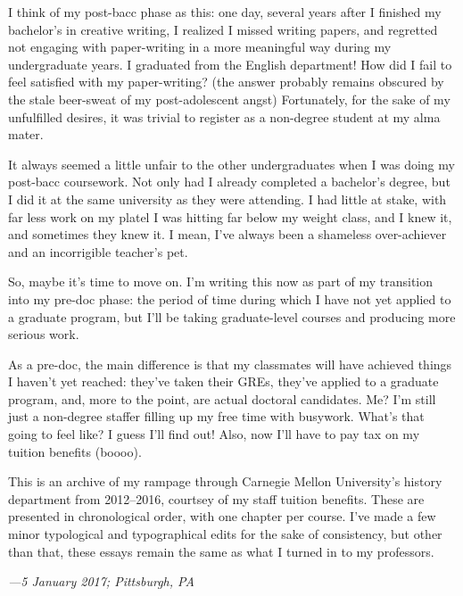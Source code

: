 I think of my post-bacc phase as this: one day, several years after I finished
my bachelor's in creative writing, I realized I missed writing papers, and
regretted not engaging with paper-writing in a more meaningful way during my
undergraduate years. I graduated from the English department! How did I fail to
feel satisfied with my paper-writing? (the answer probably remains obscured by
the stale beer-sweat of my post-adolescent angst) Fortunately, for the sake of
my unfulfilled desires, it was trivial to register as a non-degree student at my
alma mater.

It always seemed a little unfair to the other undergraduates when I was doing my
post-bacc coursework. Not only had I already completed a bachelor's degree, but
I did it at the same university as they were attending. I had little at stake,
with far less work on my platel I was hitting far below my weight class, and I
knew it, and sometimes they knew it. I mean, I've always been a shameless
over-achiever and an incorrigible teacher's pet.

So, maybe it's time to move on. I'm writing this now as part of my transition
into my pre-doc phase: the period of time during which I have not yet applied to
a graduate program, but I'll be taking graduate-level courses and producing more
serious work.

As a pre-doc, the main difference is that my classmates will have achieved
things I haven't yet reached: they've taken their GREs, they've applied to a
graduate program, and, more to the point, are actual doctoral candidates. Me?
I'm still just a non-degree staffer filling up my free time with busywork.
What's that going to feel like? I guess I'll find out! Also, now I'll have to
pay tax on my tuition benefits (boooo).

This is an archive of my rampage through Carnegie Mellon University's history
department from 2012--2016, courtsey of my staff tuition benefits. These are
presented in chronological order, with one chapter per course. I've made a few
minor typological and typographical edits for the sake of consistency, but other
than that, these essays remain the same as what I turned in to my professors.

%

\textit{---5 January 2017; Pittsburgh, PA}
